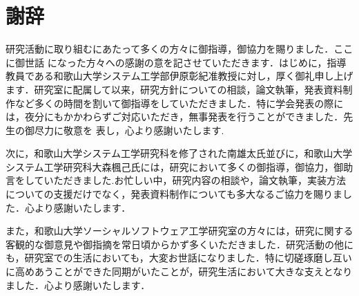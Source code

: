 \documentclass[11pt,dvipdfmx]{jreport}
\begin{document}
\chapter*{謝辞}\label{chap:thanks}

研究活動に取り組むにあたって多くの方々に御指導，御協力を賜りました．ここに御世話 になった方々への感謝の意を記させていただきます．はじめに，指導教員である和歌山大学システム工学部伊原彰紀准教授に対し，厚く御礼申し上げます．研究室に配属して以来，研究方針についての相談，論文執筆，発表資料制作など多くの時間を割いて御指導をしていただきました．特に学会発表の際には，夜分にもかかわらずご対応いただき，無事発表を行うことができました．先生の御尽力に敬意を 表し，心より感謝いたします.

次に，和歌山大学システム工学研究科を修了された南雄太氏並びに，和歌山大学システム工学研究科大森楓己氏には，研究において多くの御指導，御協力，御助言をしていただきました.お忙しい中，研究内容の相談や，論文執筆，実装方法についての支援だけでなく，発表資料制作についても多大なるご協力を賜りました．心より感謝いたします．

また，和歌山大学ソーシャルソフトウェア工学研究室の方々には，研究に関する客観的な御意見や御指摘を常日頃からかず多くいただきました．研究活動の他にも，研究室での生活においても，大変お世話になりました．特に切磋琢磨し互いに高めあうことができた同期がいたことが，研究生活において大きな支えとなりました．心より感謝いたします．



\end{document}
